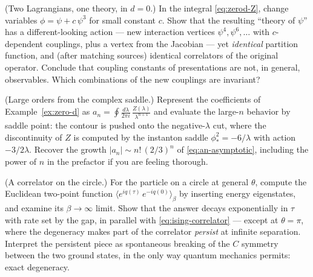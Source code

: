 \begin{exercise}[classic]
\label{exr:field-redef}
(Two Lagrangians, one theory, in $d=0$.) In the integral \eqref{eq:zerod-Z},
change variables $\phi = \psi + c\,\psi^3$ for small constant $c$. Show that the
resulting ``theory of $\psi$'' has a different-looking action --- new
interaction vertices $\psi^4, \psi^6, \dots$ with $c$-dependent couplings, plus
a vertex from the Jacobian --- yet \emph{identical} partition function, and
(after matching sources) identical correlators of the original operator.
Conclude that coupling constants of presentations are not, in general,
observables. Which combinations of the new couplings are invariant?
\end{exercise}

\begin{exercise}[medium]
\label{exr:large-order}
(Large orders from the complex saddle.) Represent the coefficients of
Example~\ref{ex:zero-d} as $a_n = \oint \frac{d\lambda}{2\pi i}\,
\frac{Z(\lambda)}{\lambda^{n+1}}$ and evaluate the large-$n$ behavior by saddle
point: the contour is pushed onto the negative-$\lambda$ cut, where the
discontinuity of $Z$ is computed by the instanton saddle $\phi_\ast^2 =
-6/\lambda$ with action $-3/2\lambda$. Recover the growth $|a_n| \sim
n!\,(2/3)^n$ of \eqref{eq:an-asymptotic}, including the power of $n$ in the
prefactor if you are feeling thorough.
\end{exercise}

\begin{exercise}[medium]
\label{exr:circle-correlator}
(A correlator on the circle.) For the particle on a circle at general $\theta$,
compute the Euclidean two-point function $\langle e^{iq(\tau)}\, e^{-iq(0)}
\rangle_\beta$ by inserting energy eigenstates, and examine its $\beta \to
\infty$ limit. Show that the answer decays exponentially in $\tau$ with rate set
by the gap, in parallel with \eqref{eq:ising-correlator} --- except at $\theta =
\pi$, where the degeneracy makes part of the correlator \emph{persist} at
infinite separation. Interpret the persistent piece as spontaneous breaking of
the $C$ symmetry between the two ground states, in the only way quantum
mechanics permits: exact degeneracy.
\end{exercise}

